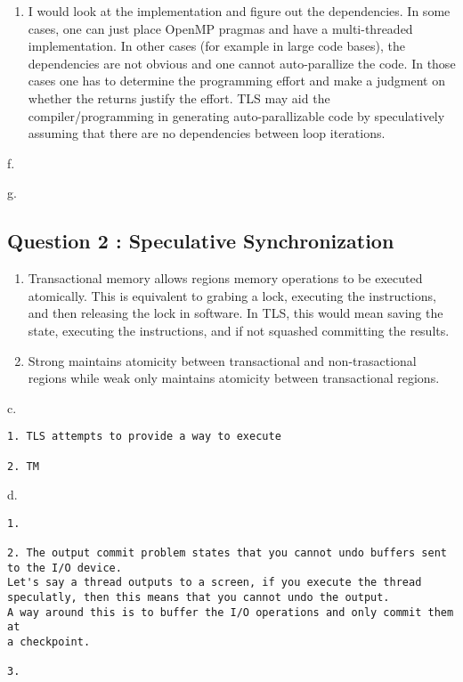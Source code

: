 \begin{enumerate}
\def\labelenumi{\alph{enumi}.}
\setcounter{enumi}{4}
\itemsep1pt\parskip0pt
\item
  I would look at the implementation and figure out the dependencies. In
  some cases, one can just place OpenMP pragmas and have a
  multi-threaded implementation. In other cases (for example in large
  code bases), the dependencies are not obvious and one cannot
  auto-parallize the code. In those cases one has to determine the
  programming effort and make a judgment on whether the returns justify
  the effort. TLS may aid the compiler/programming in generating
  auto-parallizable code by speculatively assuming that there are no
  dependencies between loop iterations.
\end{enumerate}

f.

g.

\subsection{Question 2 : Speculative Synchronization}

\begin{enumerate}
\def\labelenumi{\alph{enumi}.}
\item
  Transactional memory allows regions memory operations to be executed
  atomically. This is equivalent to grabing a lock, executing the
  instructions, and then releasing the lock in software. In TLS, this
  would mean saving the state, executing the instructions, and if not
  squashed committing the results.
\item
  Strong maintains atomicity between transactional and non-trasactional
  regions while weak only maintains atomicity between transactional
  regions.
\end{enumerate}

c.

\begin{verbatim}
1. TLS attempts to provide a way to execute

2. TM 
\end{verbatim}

d.

\begin{verbatim}
1.

2. The output commit problem states that you cannot undo buffers sent to the I/O device. 
Let's say a thread outputs to a screen, if you execute the thread speculatly, then this means that you cannot undo the output.
A way around this is to buffer the I/O operations and only commit them at
a checkpoint.

3. 
\end{verbatim}

